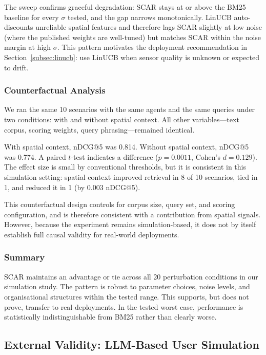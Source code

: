 \documentclass[journal]{IEEEtran}
\begin{document}
The sweep confirms graceful degradation: SCAR stays at or above the BM25
baseline for every $\sigma$ tested, and the gap narrows monotonically. LinUCB
auto-discounts unreliable spatial features and therefore lags SCAR slightly
at low noise (where the published weights are well-tuned) but matches
SCAR within the noise margin at high $\sigma$. This pattern motivates the
deployment recommendation in Section~\ref{subsec:linucb}: use LinUCB when
sensor quality is unknown or expected to drift.

\subsubsection{Counterfactual Analysis}

We ran the same 10 scenarios with the same agents and the same queries under two conditions: with and without spatial context. All other variables---text corpus, scoring weights, query phrasing---remained identical.

With spatial context, nDCG@5 was 0.814. Without spatial context, nDCG@5 was 0.774. A paired $t$-test indicates a difference ($p = 0.0011$, Cohen's $d = 0.129$). The effect size is small by conventional thresholds, but it is consistent in this simulation setting: spatial context improved retrieval in 8 of 10 scenarios, tied in 1, and reduced it in 1 (by 0.003 nDCG@5).

This counterfactual design controls for corpus size, query set, and scoring configuration, and is therefore consistent with a contribution from spatial signals. However, because the experiment remains simulation-based, it does not by itself establish full causal validity for real-world deployments.

\subsubsection{Summary}

SCAR maintains an advantage or tie across all 20 perturbation conditions in our simulation study. The pattern is robust to parameter choices, noise levels, and organisational structures within the tested range. This supports, but does not prove, transfer to real deployments. In the tested worst case, performance is statistically indistinguishable from BM25 rather than clearly worse.

\subsection{External Validity: LLM-Based User Simulation}
\label{subsec:llm_user_sim}
\end{document}
